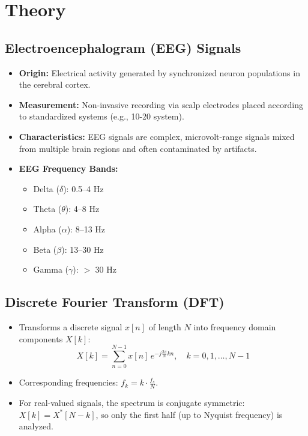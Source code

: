 \documentclass[12pt, a4paper]{article}
\begin{document}
\section{Theory}
\label{sec:theory}

\subsection{Electroencephalogram (EEG) Signals}
\begin{itemize}
    \item \textbf{Origin:} Electrical activity generated by synchronized neuron populations in the cerebral cortex.
    \item \textbf{Measurement:} Non-invasive recording via scalp electrodes placed according to standardized systems (e.g., 10-20 system).
    \item \textbf{Characteristics:} EEG signals are complex, microvolt-range signals mixed from multiple brain regions and often contaminated by artifacts.
    \item \textbf{EEG Frequency Bands:}
    \begin{itemize}
        \item Delta ($\delta$): 0.5–4 Hz
        \item Theta ($\theta$): 4–8 Hz
        \item Alpha ($\alpha$): 8–13 Hz
        \item Beta ($\beta$): 13–30 Hz
        \item Gamma ($\gamma$): $>$ 30 Hz
    \end{itemize}
\end{itemize}

\subsection{Discrete Fourier Transform (DFT)}
\begin{itemize}
    \item Transforms a discrete signal $x[n]$ of length $N$ into frequency domain components $X[k]$:
    \begin{equation}
        X[k] = \sum_{n=0}^{N-1} x[n] \, e^{-j \frac{2\pi}{N} kn}, \quad k=0,1,\dots,N-1
    \end{equation}
    \item Corresponding frequencies: $f_k = k \cdot \frac{f_s}{N}$.
    \item For real-valued signals, the spectrum is conjugate symmetric: $X[k] = X^*[N-k]$, so only the first half (up to Nyquist frequency) is analyzed.
\end{itemize}
\end{document}
